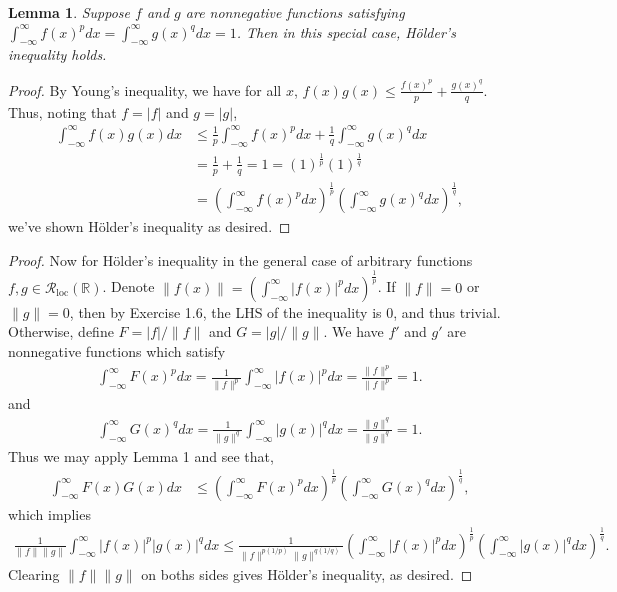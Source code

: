\documentclass[12pt]{article}
\newtheorem{lemma}{Lemma}
\theoremstyle{remark}
\theoremstyle{named}
\newcommand{\R}{\mathbb R}
\newcommand{\abs}[1]{|#1|}
\newcommand{\Rloc}{\mathcal R_{\text{loc}}}
\newcommand{\infint}{\int_{-\infty}^{\infty}}
\begin{document}
\newpage 

\begin{lemma}
    Suppose \(f\) and \(g\) are nonnegative functions satisfying \(\infint f(x)^p dx = \infint g(x)^q dx = 1\). Then in this special case, H\"older's inequality holds.
\end{lemma}

\begin{proof}
    By Young's inequality, we have for all \(x\), \(f(x) g(x) \leq \frac{f(x)^p}{p} + \frac{g(x)^q}{q}\).
    Thus, noting that \(f = |f|\) and \(g = |g|\),
    \begin{align*}
        \infint f(x) g(x) dx &\leq \frac{1}{p}\infint f(x)^p dx + \frac{1}{q}\infint g(x)^q dx \\
        &= \frac{1}{p} + \frac{1}{q} = 1 = (1)^\frac{1}{p} (1)^\frac{1}{q}\\
        &= \left(\infint f(x)^p dx\right)^{\frac{1}{p}} \left(\infint g(x)^q dx\right)^{\frac{1}{q}},
    \end{align*}
    we've shown H\"older's inequality as desired.
\end{proof}

\begin{proof}
    Now for H\"older's inequality in the general case of arbitrary functions \(f, g \in \Rloc(\R)\). Denote \(\|f(x) \| = \left(\infint \abs{f(x)}^p dx\right)^\frac{1}{p}\). If \(\|f\| = 0\) or \(\|g\| = 0\), then by Exercise 1.6, the LHS of the inequality is 0, and thus trivial. Otherwise, define \(F = |f| / \| f \|\) and \(G = |g| / \|g\|\). We have \(f'\) and \(g'\) are nonnegative functions which satisfy
    \begin{align*}
        \infint F(x)^p dx = \frac{1}{\|f\|^p}\infint \abs{f(x)}^p dx = \frac{\|f\|^p}{\|f\|^p} = 1.
    \end{align*} 
    and
    \begin{align*}
        \infint G(x)^q dx = \frac{1}{\|g\|^q}\infint \abs{g(x)}^q dx = \frac{\|g\|^q}{\|g\|^q} = 1.
    \end{align*}
    Thus we may apply Lemma 1 and see that, 
    \begin{align*}
        \infint F(x) G(x) dx &\leq \left(\infint F(x)^p dx\right)^{\frac{1}{p}} \left(\infint G(x)^q dx\right)^{\frac{1}{q}},
    \end{align*}
    which implies
    \begin{align*}
        \frac{1}{\|f\|\|g\|}\infint \abs{f(x)}^p \abs{g(x)}^q dx \leq \frac{1}{\|f\|^{p (1/p)}\|g\|^{q (1/q)}} \left(\infint \abs{f(x)}^p dx\right)^{\frac{1}{p}} \left(\infint \abs{g(x)}^q dx\right)^{\frac{1}{q}}.
    \end{align*}
    Clearing \(\|f\|\|g\|\) on boths sides gives H\"older's inequality, as desired.
\end{proof}
\end{document}
